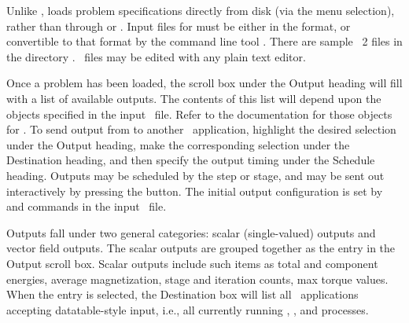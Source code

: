 Unlike ,
 loads problem specifications
directly from disk (via the  menu selection),
rather than through
 or
.  Input files for  must be either
in the 
format, or convertible to that format by the command line tool
.  There are sample \MIF~2 files in the
directory .  \MIF\ files may be edited with
any plain text editor.

Once a problem has been loaded, the scroll box under the Output
heading will fill with a list of available outputs.  The contents of
this list will depend upon the  objects specified in the
input \MIF\ file.  Refer to the documentation for those objects for
.
To send output from  to another \OOMMF\ application, highlight the
desired selection under the Output heading, make the corresponding
selection under the Destination heading, and then specify the output
timing under the Schedule heading.  Outputs may be scheduled by the
step or stage, and may be sent out interactively by pressing the
 button.  The initial output configuration is set by
 and
 commands in the input
\MIF\ file.

Outputs fall under two general categories: scalar (single-valued)
outputs and vector field outputs.  The scalar outputs are grouped
together as the  entry in the Output scroll box.
Scalar outputs include such items as total and component energies,
average magnetization, stage and iteration counts, max torque values.
When the  entry is selected, the Destination box will
list all \OOMMF\ applications accepting datatable-style input, i.e., all
currently running
,
, and
 processes.

